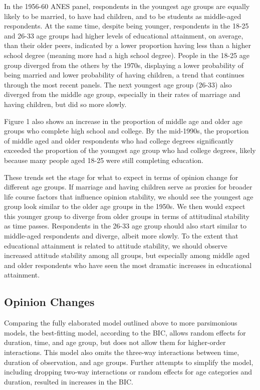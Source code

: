 \documentclass[
  12pt,
]{article}
\begin{document}
In the 1956-60 ANES panel, respondents in the youngest age groups are equally likely to be married, to have had children, and to be students as middle-aged respondents. At the same time, despite being younger, respondents in the 18-25 and 26-33 age groups had higher levels of educational attainment, on average, than their older peers, indicated by a lower proportion having less than a higher school degree (meaning more had a high school degree). People in the 18-25 age group diverged from the others by the 1970s, displaying a lower probability of being married and lower probability of having children, a trend that continues through the most recent panels. The next youngest age group (26-33) also diverged from the middle age group, especially in their rates of marriage and having children, but did so more slowly.

Figure 1 also shows an increase in the proportion of middle age and older age groups who complete high school and college. By the mid-1990s, the proportion of middle aged and older respondents who had college degrees significantly exceeded the proportion of the youngest age group who had college degrees, likely because many people aged 18-25 were still completing education.

These trends set the stage for what to expect in terms of opinion change for different age groups. If marriage and having children serve as proxies for broader life course factors that influence opinion stability, we should see the youngest age group look similar to the older age groups in the 1950s. We then would expect this younger group to diverge from older groups in terms of attitudinal stability as time passes. Respondents in the 26-33 age group should also start similar to middle-aged respondents and diverge, albeit more slowly. To the extent that educational attainment is related to attitude stability, we should observe increased attitude stability among all groups, but especially among middle aged and older respondents who have seen the most dramatic increases in educational attainment.

\hypertarget{opinion-changes}{%
\subsection{Opinion Changes}\label{opinion-changes}}

Comparing the fully elaborated model outlined above to more parsimonious models, the best-fitting model, according to the BIC, allows random effects for duration, time, and age group, but does not allow them for higher-order interactions. This model also omits the three-way interactions between time, duration of observation, and age groups. Further attempts to simplify the model, including dropping two-way interactions or random effects for age categories and duration, resulted in increases in the BIC.
\end{document}
